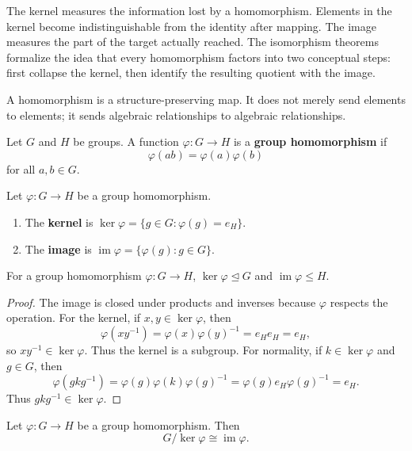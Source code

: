 The kernel measures the information lost by a homomorphism. Elements in the kernel become indistinguishable from the identity after mapping. The image measures the part of the target actually reached. The isomorphism theorems formalize the idea that every homomorphism factors into two conceptual steps: first collapse the kernel, then identify the resulting quotient with the image.

A homomorphism is a structure-preserving map. It does not merely send elements to elements; it sends algebraic relationships to algebraic relationships.

\begin{definition}
Let $G$ and $H$ be groups. A function $\varphi:G\to H$ is a \textbf{group homomorphism} if
\[
    \varphi(ab)=\varphi(a)\varphi(b)
\]
for all $a,b\in G$.
\end{definition}

\begin{definition}
Let $\varphi:G\to H$ be a group homomorphism.
\begin{enumerate}
    \item The \textbf{kernel} is $\ker\varphi=\{g\in G:\varphi(g)=e_H\}$.
    \item The \textbf{image} is $\operatorname{im}\varphi=\{\varphi(g):g\in G\}$.
\end{enumerate}
\end{definition}

\begin{proposition}
For a group homomorphism $\varphi:G\to H$, $\ker\varphi\trianglelefteq G$ and $\operatorname{im}\varphi\leq H$.
\end{proposition}

\begin{proof}
The image is closed under products and inverses because $\varphi$ respects the operation. For the kernel, if $x,y\in\ker\varphi$, then
\[
    \varphi(xy^{-1})=\varphi(x)\varphi(y)^{-1}=e_He_H=e_H,
\]
so $xy^{-1}\in\ker\varphi$. Thus the kernel is a subgroup. For normality, if $k\in\ker\varphi$ and $g\in G$, then
\[
    \varphi(gkg^{-1})=\varphi(g)\varphi(k)\varphi(g)^{-1}=\varphi(g)e_H\varphi(g)^{-1}=e_H.
\]
Thus $gkg^{-1}\in\ker\varphi$.
\end{proof}

\begin{theorem}
Let $\varphi:G\to H$ be a group homomorphism. Then
\[
    G/\ker\varphi\cong \operatorname{im}\varphi.
\]
\end{theorem}


